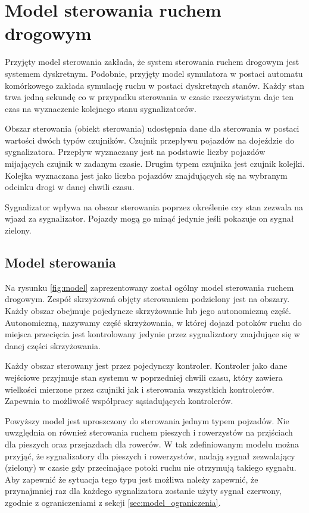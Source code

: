 \chapter{Model sterowania ruchem drogowym}
\label{chap:model}
Przyjęty model sterowania zakłada, że system sterowania ruchem drogowym jest systemem dyskretnym. Podobnie, przyjęty model symulatora w postaci automatu komórkowego zakłada symulację ruchu w postaci dyskretnych stanów. Każdy stan trwa jedną sekundę co w przypadku sterowania w czasie rzeczywistym daje ten czas na wyznaczenie kolejnego stanu sygnalizatorów.

Obszar sterowania (obiekt sterowania) udostępnia dane dla sterowania w postaci wartości dwóch typów czujników. Czujnik przepływu pojazdów na dojeździe do sygnalizatora. Przepływ wyznaczany jest na podstawie liczby pojazdów mijających czujnik w zadanym czasie. Drugim typem czujnika jest czujnik kolejki. Kolejka wyznaczana jest jako liczba pojazdów znajdujących się na wybranym odcinku drogi w danej chwili czasu.

Sygnalizator wpływa na obszar sterowania poprzez określenie czy stan zezwala na wjazd za sygnalizator. Pojazdy mogą go minąć jedynie jeśli pokazuje on sygnał zielony.

\section{Model sterowania}
\label{sec:model_opis}

Na rysunku \ref{fig:model} zaprezentowany został ogólny model sterowania ruchem drogowym.
Zespół skrzyżowań objęty sterowaniem podzielony jest na obszary.
Każdy obszar obejmuje pojedyncze skrzyżowanie lub jego autonomiczną część.
Autonomiczną, nazywamy część skrzyżowania, w której dojazd potoków ruchu do miejsca przecięcia jest kontrolowany jedynie przez sygnalizatory znajdujące się w danej części skrzyżowania.

Każdy obszar sterowany jest przez pojedynczy kontroler.
Kontroler jako dane wejściowe przyjmuje stan systemu w poprzedniej chwili czasu,
który zawiera wielkości mierzone przez czujniki jak i sterowania wszystkich kontrolerów. Zapewnia to możliwość współpracy sąsiadujących kontrolerów.

Powyższy model jest uproszczony do sterowania jednym typem pojzadów. Nie uwzględnia on również sterowania ruchem pieszych i rowerzystów na przjściach dla pieszych oraz przejazdach dla rowerów. W tak zdefiniowanym modelu można przyjąć, że sygnalizatory dla pieszych i rowerzystów, nadają sygnał zezwalający (zielony) w czasie gdy przecinające potoki ruchu nie otrzymują takiego sygnału.
Aby zapewnić że sytuacja tego typu jest możliwa należy zapewnić, że przynajmniej raz dla każdego sygnalizatora zostanie użyty sygnał czerwony, zgodnie z ograniczeniami z sekcji \ref{sec:model_ograniczenia}.

